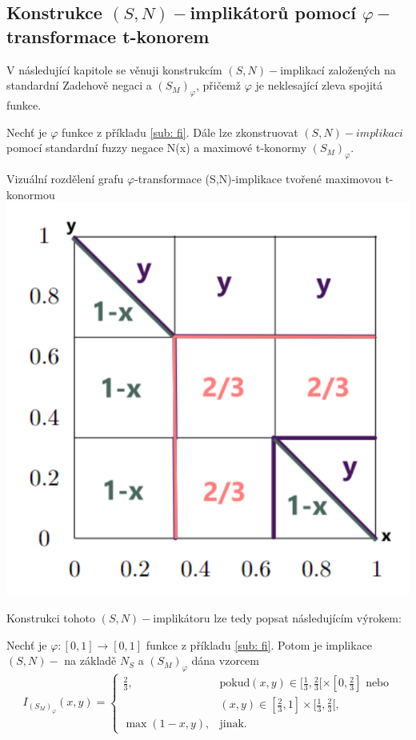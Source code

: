 \subsection{Konstrukce $(S,N)-$implik\'ator\r u pomoc\'i $\varphi-$transformace t-konorem}
 V následující kapitole se věnuji konstrukcím $(S,N)-$implikací založených na standardní Zadehově negaci a $(S_M)_\varphi$, přičemž $\varphi$ je neklesající zleva spojitá funkce.
 
\begin{example} 
Nech\v t je $\varphi$ funkce z p\v ríkladu \ref{sub: fi}. Dále lze zkonstruovat $(S,N)-implikaci$ pomocí standardní fuzzy negace N(x) a maximové t-konormy $(S_M)_\varphi$.    
     \begin{graph} 
     Vizu\' aln\' i rozd\v elen\'i grafu $\varphi$-transformace (S,N)-implikace tvořené maximovou t-konormou\\
        \centering
        \includegraphics[scale=0.8]{template-fig/phi-impli.pdf}
    \end{graph}
\end{example}

 Konstrukci tohoto $(S,N)-$implikátoru lze tedy popsat následujícím výrokem:
\begin{sentence}
    Nech\v t je  $\varphi:[0,1]\rightarrow [0,1]$
funkce z příkladu \ref{sub: fi}.
Potom je implikace $(S,N)-$ na základě $N_S$ a $(S_M)_{\varphi}$ dána vzorcem
$$ I_{(S_M)_{\varphi}}(x,y) = \begin{cases} \frac{2}{3}, &\mbox {pokud
$(x,y)\in [\frac{1}{3},\frac{2}{3}[\times[0,\frac{2}{3}]$ nebo}
\\ & (x,y)\in [\frac{2}{3},1]\times[\frac{1}{3},\frac{2}{3}[,
\\ \max(1-x,y), &\mbox {jinak.}
\end{cases} $$
\end{sentence}




